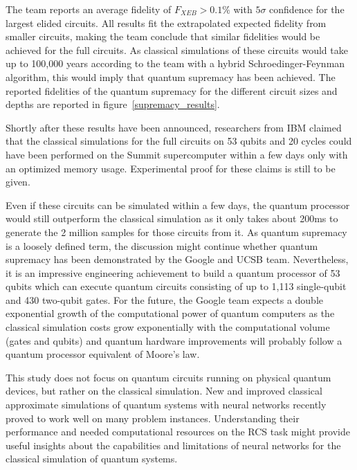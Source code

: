 The team reports an average fidelity of $F_{XEB} > 0.1\%$ with $5\sigma$ confidence
for the largest elided circuits. All results fit the extrapolated expected
fidelity from smaller circuits, making the team conclude that similar fidelities
would be achieved for the full circuits. As classical simulations of these
circuits would take up to 100,000 years according to the team with a hybrid
Schroedinger-Feynman algorithm, this would imply
that quantum supremacy has been achieved. The reported fidelities of the quantum supremacy for
the different circuit sizes and depths are reported in figure~\ref{supremacy_results}.

Shortly after these results have been announced, researchers from IBM claimed that the classical simulations
for the full circuits on 53 qubits and 20 cycles could have been performed
on the Summit supercomputer within a few days only with an optimized memory
usage. Experimental proof for these claims is still to be given.

Even if these circuits can be simulated within a few days, the quantum
processor would still outperform the classical simulation as it only
takes about 200ms to generate the 2 million samples for those circuits from it. As quantum
supremacy is a loosely defined term, the discussion might continue whether
quantum supremacy has been demonstrated by the Google and UCSB team. Nevertheless, it is
an impressive engineering achievement to build a quantum processor of 53 qubits
which can execute quantum circuits consisting of up to 1,113 single-qubit and
430 two-qubit gates. For the future, the Google team expects a double exponential growth of the computational
power of quantum computers as the classical simulation costs grow exponentially
with the computational volume (gates and qubits) and quantum hardware
improvements will probably follow a quantum processor equivalent of Moore's law.

This study does not focus on quantum circuits running on physical quantum devices,
but rather on the classical simulation. New and improved classical
approximate simulations of quantum systems with neural networks recently proved
to work well on many problem instances. 
Understanding their performance and needed computational resources on
the RCS task might provide useful insights about the capabilities and
limitations of neural networks for the classical simulation of quantum systems.
